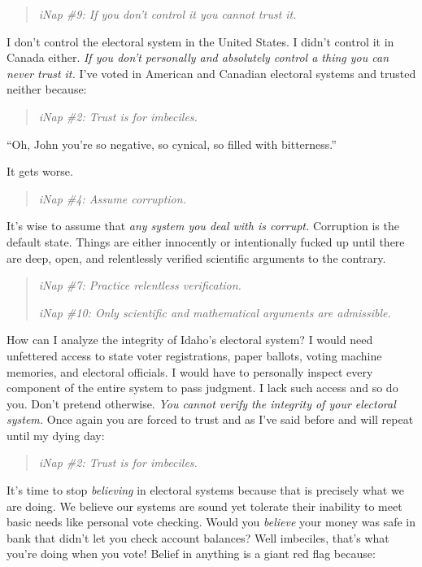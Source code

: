 \begin{quote}
\emph{iNap \#9: If you don't control it you cannot trust it.}
\end{quote}

I don't control the electoral system in the United States. I didn't
control it in Canada either. \emph{If you don't personally and
absolutely control a thing you can never trust it.} I've voted in
American and Canadian electoral systems and trusted neither because:

\begin{quote}
\emph{iNap \#2: Trust is for imbeciles.}
\end{quote}

``Oh, John you're so negative, so cynical, so filled with bitterness.''

It gets worse.

\begin{quote}
\emph{iNap \#4: Assume corruption.}
\end{quote}

It's wise to assume that \emph{any system you deal with is corrupt.}
Corruption is the default state. Things are either innocently or
intentionally fucked up until there are deep, open, and relentlessly
verified scientific arguments to the contrary.

\begin{quote}
\emph{iNap \#7: Practice relentless verification.}

\emph{iNap \#10: Only scientific and mathematical arguments are admissible.}
\end{quote}

How can I analyze the integrity of Idaho's electoral system? I would
need unfettered access to state voter registrations, paper ballots,
voting machine memories, and electoral officials. I would have to
personally inspect every component of the entire system to pass
judgment. I lack such access and so do you. Don't pretend otherwise.
\emph{You cannot verify the integrity of your electoral system.} Once
again you are forced to trust and as I've said before and will repeat
until my dying day:

\begin{quote}
\emph{iNap \#2: Trust is for imbeciles.}
\end{quote}

It's time to stop \emph{believing} in electoral systems because that is
precisely what we are doing. We believe our systems are sound yet
tolerate their inability to meet basic needs like personal vote
checking. Would you \emph{believe} your money was safe in bank that
didn't let you check account balances? Well imbeciles, that's what
you're doing when you vote! Belief in anything is a giant red flag
because:

